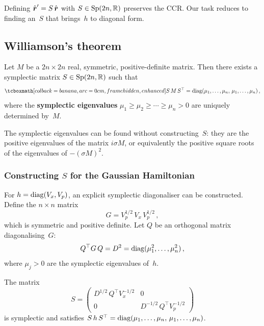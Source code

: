 Defining $\hat{\boldsymbol{r}}' = S\,\hat{\boldsymbol{r}}$ with
$S \in \mathrm{Sp}(2n,\mathbb{R})$ preserves the CCR.  Our task reduces to
finding an~$S$ that brings~$h$ to diagonal form.

\subsection{Williamson's theorem}%
\label{sec:williamson}

\begin{theorem}\label{thm:williamson}
  Let $M$ be a $2n \times 2n$ real, symmetric, positive-definite
  matrix.  Then there exists a symplectic matrix
  $S \in \mathrm{Sp}(2n,\mathbb{R})$ such that
  \begin{equation}\label{eq:williamson}
    \eqbox{S\, M\, S^\top
    = \diag(\mu_1,\ldots,\mu_n,\,\mu_1,\ldots,\mu_n)}\,,
  \end{equation}
  where the \textbf{symplectic eigenvalues}
  $\mu_1 \geq \mu_2 \geq \cdots \geq \mu_n > 0$ are uniquely
  determined by~$M$.
\end{theorem}

\begin{remark}
  The symplectic eigenvalues can be found without constructing~$S$:
  they are the positive eigenvalues of the matrix $i\sigma M$, or
  equivalently the positive square roots of the eigenvalues of
  $-(\sigma M)^2$.
\end{remark}

\subsubsection{Constructing $S$ for the Gaussian Hamiltonian}

For $h = \operatorname{diag}(V_x, V_p)$, an explicit symplectic diagonaliser can be
constructed.  Define the $n \times n$ matrix
\begin{equation}\label{eq:G-matrix}
  G = V_p^{1/2}\, V_x\, V_p^{1/2}\,,
\end{equation}
which is symmetric and positive definite.  Let $Q$ be an orthogonal
matrix diagonalising~$G$:
\begin{equation}\label{eq:Q-diag}
  Q^\top G\, Q = D^2
  = \operatorname{diag}(\mu_1^2,\ldots,\mu_n^2)\,,
\end{equation}
where $\mu_j > 0$ are the symplectic eigenvalues of~$h$.

\begin{keyresult}
  The matrix
  \begin{equation}\label{eq:S-explicit}
    S = \begin{pmatrix}
      D^{1/2}\, Q^\top V_x^{-1/2} & 0 \\[4pt]
      0 & D^{-1/2}\, Q^\top V_p^{-1/2}
    \end{pmatrix}
  \end{equation}
  is symplectic and satisfies $S\, h\, S^\top = \operatorname{diag}(\mu_1,\ldots,\mu_n,\,\mu_1,\ldots,\mu_n)$.
\end{keyresult}

